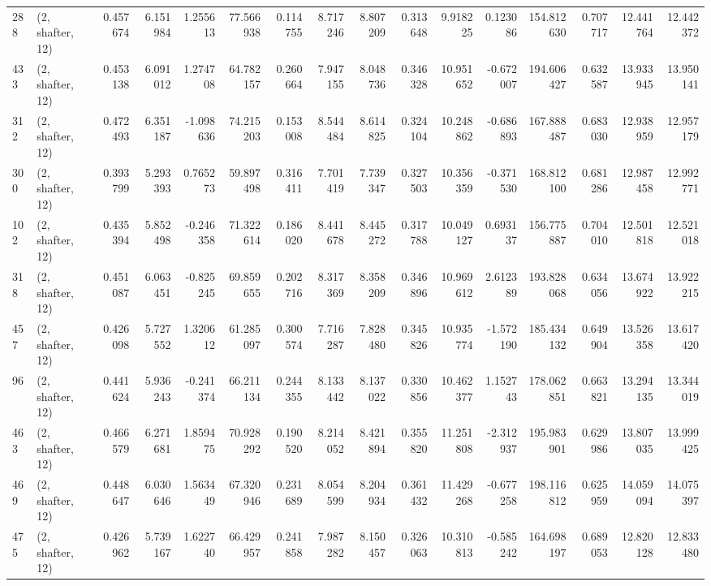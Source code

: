 \begin{tabular}{llrrrrrrrrrrrrrr}
288 &  (2, shafter, 12) &   0.457674 &   6.151984 &   1.255613 &    77.566938 &   0.114755 &   8.717246 &   8.807209 &  0.313648 &   9.918225 &   0.123086 &   154.812630 &   0.707717 &  12.441764 &  12.442372 \\
433 &  (2, shafter, 12) &   0.453138 &   6.091012 &   1.274708 &    64.782157 &   0.260664 &   7.947155 &   8.048736 &  0.346328 &  10.951652 &  -0.672007 &   194.606427 &   0.632587 &  13.933945 &  13.950141 \\
312 &  (2, shafter, 12) &   0.472493 &   6.351187 &  -1.098636 &    74.215203 &   0.153008 &   8.544484 &   8.614825 &  0.324104 &  10.248862 &  -0.686893 &   167.888487 &   0.683030 &  12.938959 &  12.957179 \\
300 &  (2, shafter, 12) &   0.393799 &   5.293393 &   0.765273 &    59.897498 &   0.316411 &   7.701419 &   7.739347 &  0.327503 &  10.356359 &  -0.371530 &   168.812100 &   0.681286 &  12.987458 &  12.992771 \\
102 &  (2, shafter, 12) &   0.435394 &   5.852498 &  -0.246358 &    71.322614 &   0.186020 &   8.441678 &   8.445272 &  0.317788 &  10.049127 &   0.693137 &   156.775887 &   0.704010 &  12.501818 &  12.521018 \\
318 &  (2, shafter, 12) &   0.451087 &   6.063451 &  -0.825245 &    69.859655 &   0.202716 &   8.317369 &   8.358209 &  0.346896 &  10.969612 &   2.612389 &   193.828068 &   0.634056 &  13.674922 &  13.922215 \\
457 &  (2, shafter, 12) &   0.426098 &   5.727552 &   1.320612 &    61.285097 &   0.300574 &   7.716287 &   7.828480 &  0.345826 &  10.935774 &  -1.572190 &   185.434132 &   0.649904 &  13.526358 &  13.617420 \\
96  &  (2, shafter, 12) &   0.441624 &   5.936243 &  -0.241374 &    66.211134 &   0.244355 &   8.133442 &   8.137022 &  0.330856 &  10.462377 &   1.152743 &   178.062851 &   0.663821 &  13.294135 &  13.344019 \\
463 &  (2, shafter, 12) &   0.466579 &   6.271681 &   1.859475 &    70.928292 &   0.190520 &   8.214052 &   8.421894 &  0.355820 &  11.251808 &  -2.312937 &   195.983901 &   0.629986 &  13.807035 &  13.999425 \\
469 &  (2, shafter, 12) &   0.448647 &   6.030646 &   1.563449 &    67.320946 &   0.231689 &   8.054599 &   8.204934 &  0.361432 &  11.429268 &  -0.677258 &   198.116812 &   0.625959 &  14.059094 &  14.075397 \\
475 &  (2, shafter, 12) &   0.426962 &   5.739167 &   1.622740 &    66.429957 &   0.241858 &   7.987282 &   8.150457 &  0.326063 &  10.310813 &  -0.585242 &   164.698197 &   0.689053 &  12.820128 &  12.833480 \\

\end{tabular}
